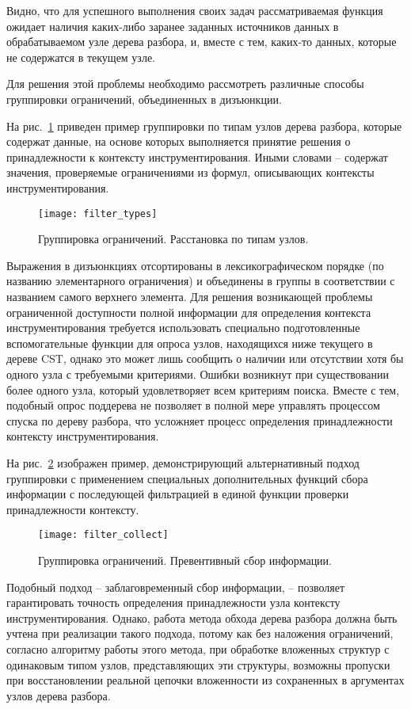 Видно, что для успешного выполнения своих задач рассматриваемая функция ожидает наличия каких-либо заранее заданных источников данных в обрабатываемом узле дерева разбора, и, вместе с тем, каких-то данных, которые не содержатся в текущем узле.

Для решения этой проблемы необходимо рассмотреть различные способы группировки ограничений, объединенных в дизъюнкции.

На рис.~\ref{fig:filter_types} приведен пример группировки по типам узлов дерева разбора, которые содержат данные, на основе которых выполняется принятие решения о принадлежности к контексту инструментирования. Иными словами -- содержат значения, проверяемые ограничениями из формул, описывающих контексты инструментирования.

\begin{figure}[!h]
	\centering
	\texttt{[image: filter\_types]}
	\caption{Группировка ограничений. Расстановка по типам узлов.}
	\label{fig:filter_types}
\end{figure}

Выражения в дизъюнкциях отсортированы в лексикографическом порядке (по названию элементарного ограничения) и объединены в группы в соответствии с названием самого верхнего элемента.
Для решения возникающей проблемы ограниченной доступности полной информации для определения контекста инструментирования требуется использовать специально подготовленные вспомогательные функции для опроса узлов, находящихся ниже текущего в дереве CST, однако это может лишь сообщить о наличии или отсутствии хотя бы одного узла с требуемыми критериями.
Ошибки возникнут при существовании более одного узла, который удовлетворяет всем критериям поиска.
Вместе с тем, подобный опрос поддерева не позволяет в полной мере управлять процессом спуска по дереву разбора, что усложняет процесс определения принадлежности контексту инструментирования.

На рис.~\ref{fig:filter_collect} изображен пример, демонстрирующий альтернативный подход группировки с применением специальных дополнительных функций сбора информации с последующей фильтрацией в единой функции проверки принадлежности контексту.

\begin{figure}[!h]
	\centering
	\texttt{[image: filter\_collect]}
	\caption{Группировка ограничений. Превентивный сбор информации.}
	\label{fig:filter_collect}
\end{figure}

Подобный подход -- заблаговременный сбор информации, -- позволяет гарантировать точность определения принадлежности узла контексту инструментирования.
Однако, работа метода обхода дерева разбора должна быть учтена при реализации такого подхода, потому как без наложения ограничений, согласно алгоритму работы этого метода, при обработке вложенных структур с одинаковым типом узлов, представляющих эти структуры, возможны пропуски при восстановлении реальной цепочки вложенности из сохраненных в аргументах узлов дерева разбора.

